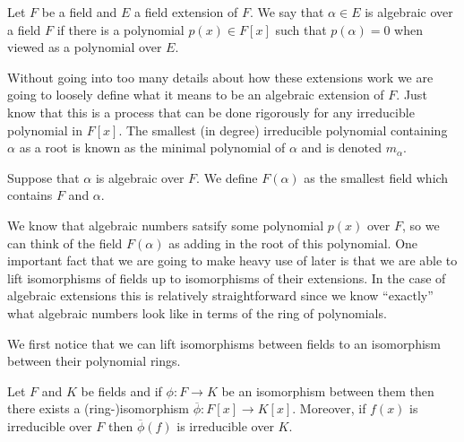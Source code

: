 \begin{defn}
  Let $F$ be a field and $E$ a field extension of $F$.
  We say that $\alpha \in E$ is algebraic over a field $F$ if there is a 
  polynomial $p(x) \in F[x]$ such that $p(\alpha) = 0$ when viewed as
  a polynomial over $E$.
\end{defn}

Without going into too many details about how these extensions work we are
going to loosely define what it means to be an algebraic extension of $F$. Just
know that this is a process that can be done rigorously for any irreducible
polynomial in $F[x]$. The smallest (in degree) irreducible polynomial
containing $\alpha$ as a root is known as the minimal polynomial of $\alpha$
and is denoted $m_{\alpha}$.

\begin{defn}
  Suppose that $\alpha$ is algebraic over $F$. We define $F(\alpha)$ as the
  smallest field which contains $F$ and $\alpha$.
\end{defn}

We know that algebraic numbers satsify some polynomial $p(x)$ over $F$, 
so we can think of the field $F(\alpha)$ as adding in the root of this
polynomial. One important fact that we are going to make heavy use of later is
that we are able to lift isomorphisms of fields up to isomorphisms of their
extensions. In the case of algebraic extensions this is relatively
straightforward since we know ``exactly'' what algebraic numbers look like in
terms of the ring of polynomials. 

We first notice that we can lift isomorphisms between fields to an isomorphism
between their polynomial rings. 

\begin{lemma}
  Let $F$ and $K$ be fields and if $\phi: F \to K$ be an isomorphism between
  them then there exists a (ring-)isomorphism $\overline{\phi}: F[x] \to
  K[x]$. Moreover, if $f(x)$ is irreducible over $F$ then $\overline{\phi}(f)$ 
  is irreducible over $K$.
\end{lemma}


